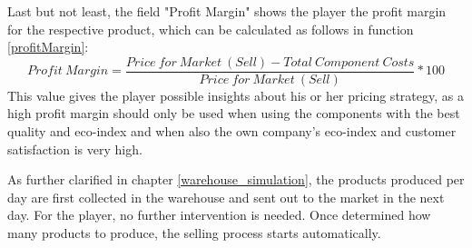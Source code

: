 Last but not least, the field "Profit Margin" shows the player the profit margin for the respective product, which can be calculated as follows in function \ref{profitMargin}:
\begin{equation}
\label{profitMargin}
    Profit~Margin = \frac{Price~for~Market~(Sell) - Total~Component ~Costs}{Price~for~Market~(Sell)} * 100
\end{equation}
This value gives the player possible insights about his or her pricing strategy, as a high profit margin should only be used when using the components with the best quality and eco-index and when also the own company's eco-index and customer satisfaction is very high.

As further clarified in chapter \ref{warehouse_simulation}, the products produced per day are first collected in the warehouse and sent out to the market in the next day. For the player, no further intervention is needed. Once determined how many products to produce, the selling process starts automatically.